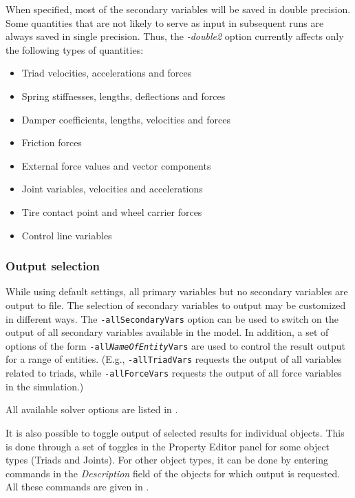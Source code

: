 When specified,
most of the secondary variables will be saved in double precision.
Some quantities that are not likely to serve as input in subsequent runs
are always saved in single precision. Thus, the
{\sl-double2} option currently affects only the following types of quantities:

\begin{itemize}
\item Triad velocities, accelerations and forces
\item Spring stiffnesses, lengths, deflections and forces
\item Damper coefficients, lengths, velocities and forces
\item Friction forces
\item External force values and vector components
\item Joint variables, velocities and accelerations
\item Tire contact point and wheel carrier forces
\item Control line variables
\end{itemize}

\subsubsection{Output selection}

While using default settings, all primary variables but no secondary variables
are output to file. The selection of secondary variables to output may be
customized in different ways. The {\tt-allSecondaryVars} option can be used to
switch on the output of all secondary variables available in the model.
In addition, a set of options of the form {\tt-all{\sl NameOfEntity}Vars}
are used to control the result output for a range of entities.
(E.g., {\tt-allTriadVars} requests the output of all variables related to
triads, while {\tt-allForceVars} requests the output of all force variables
in the simulation.)

All available solver options are listed in
.

It is also possible to toggle output of selected results for individual objects.
This is done through a set of toggles in the Property Editor panel for some
object types (Triads and Joints). For other object types, it can be done by
entering commands in the {\sl Description} field of the objects for which
output is requested. All these commands are given
in .

